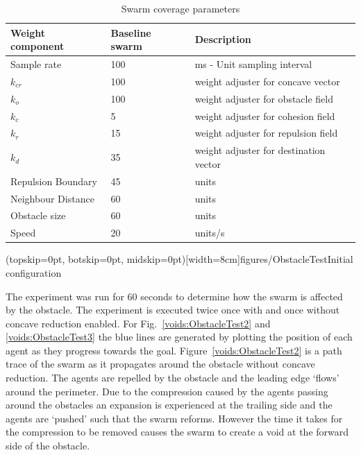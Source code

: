 \documentclass{ieeeaccess}
\begin{document}
\begin{table}
\caption{Swarm coverage parameters}
\label{tab:SwarmCoverageParameters}
\begin{center}
\begin{tabular}{| p{1.3cm} | p{1.3cm} | p{3.5cm} |}
\hline
\bf Weight \bf component & \bf Baseline \bf swarm & \bf Description \\ \hline
Sample rate & 100 & ms - Unit sampling interval\\  \hline
$k_{cr}$ & 100 & weight adjuster for concave vector\\  \hline
$k_o$ & 100 & weight adjuster for obstacle field\\  \hline
$k_c$ & 5 & weight adjuster for cohesion field\\  \hline
$k_r$ & 15 & weight adjuster for repulsion  field\\  \hline
$k_d$ & 35 & weight adjuster for destination vector\\  \hline
Repulsion Boundary & 45 & units\\  \hline
Neighbour Distance & 60 & units\\  \hline
Obstacle size & 60 & units\\  \hline
Speed & 20 & units/s\\  \hline
\end{tabular}
\end{center}
\end{table}

\Figure[t!](topskip=0pt, botskip=0pt, midskip=0pt)[width=8cm]{figures/ObstacleTest}{Initial configuration\label{voids:ObstacleTest1}}

The experiment was run for 60 seconds to determine how the swarm is affected by the obstacle. The experiment is executed twice once with and once without concave reduction enabled. For Fig.~\ref{voids:ObstacleTest2} and \ref{voids:ObstacleTest3} the blue lines are generated by plotting the position of each agent as they progress towards the goal. Figure~\ref{voids:ObstacleTest2} is a path trace of the swarm as it propagates around the obstacle without concave reduction. The agents are repelled by the obstacle and the leading edge `flows' around the perimeter. Due to the compression caused by the agents passing around the obstacles an expansion is experienced at the trailing side and the agents are `pushed' such that the swarm reforms. However the time it takes for the compression to be removed causes the swarm to create a void at the forward side of the obstacle.  
\end{document}
